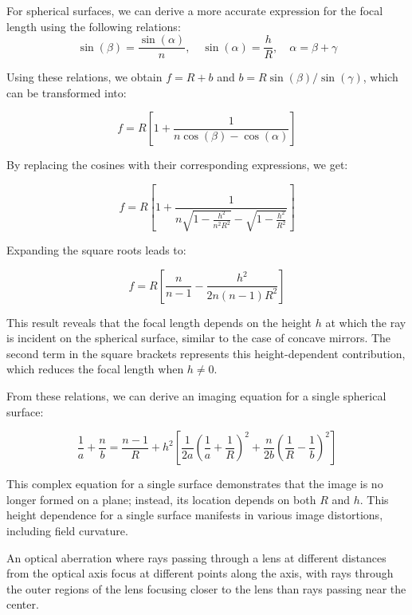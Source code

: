 \documentclass[
  a4paper,
]{book}
\begin{document}
For spherical surfaces, we can derive a more accurate expression for the
focal length using the following relations:
\[\sin(\beta)=\frac{\sin(\alpha)}{n}, \quad \sin(\alpha)=\frac{h}{R}, \quad \alpha=\beta+\gamma\]

Using these relations, we obtain \(f=R+b\) and
\(b=R\sin(\beta)/\sin(\gamma)\), which can be transformed into:

\[
f=R\left [ 1+ \frac{1}{n\cos(\beta)-\cos(\alpha)}\right ]
\]

By replacing the cosines with their corresponding expressions, we get:

\[
f=R\left [ 1+ \frac{1}{n\sqrt{1-\frac{h^2}{n^2 R^2}}-\sqrt{1-\frac{h^2}{R^2}}}\right ]
\]

Expanding the square roots leads to:

\[
f=R\left [ \frac{n}{n-1}- \frac{h^2}{2n(n-1)R^2} \right]
\]

This result reveals that the focal length depends on the height \(h\) at
which the ray is incident on the spherical surface, similar to the case
of concave mirrors. The second term in the square brackets represents
this height-dependent contribution, which reduces the focal length when
\(h\neq 0\).

From these relations, we can derive an imaging equation for a single
spherical surface:

\[
\frac{1}{a}+\frac{n}{b}=\frac{n-1}{R}+h^2\left [ \frac{1}{2a}\left ( \frac{1}{a}+\frac{1}{R}\right )^2 +\frac{n}{2b}\left ( \frac{1}{R}-\frac{1}{b}\right )^2\right]
\]

This complex equation for a single surface demonstrates that the image
is no longer formed on a plane; instead, its location depends on both
\(R\) and \(h\). This height dependence for a single surface manifests
in various image distortions, including field curvature.

\begin{tcolorbox}[enhanced jigsaw, breakable, toptitle=1mm, bottomrule=.15mm, colbacktitle=quarto-callout-note-color!10!white, title=\textcolor{quarto-callout-note-color}{\faInfo}\hspace{0.5em}{Spherical Aberration}, arc=.35mm, rightrule=.15mm, bottomtitle=1mm, opacityback=0, toprule=.15mm, coltitle=black, leftrule=.75mm, opacitybacktitle=0.6, colback=white, left=2mm, titlerule=0mm, colframe=quarto-callout-note-color-frame]

An optical aberration where rays passing through a lens at different
distances from the optical axis focus at different points along the
axis, with rays through the outer regions of the lens focusing closer to
the lens than rays passing near the center.

\end{tcolorbox}
\end{document}
